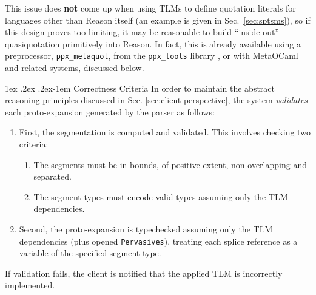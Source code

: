 \documentclass[acmsmall]{acmart}
\makeatletter
\renewcommand{\subsubsection}{%
  \@startsection{subsubsection}{3}%
  {\z@}{1ex \@plus .2ex \@minus .2ex}{-1em}%
  {\normalfont\normalsize\bfseries}%
}
\newcommand{\li}[1]{\lstinline[basicstyle=\ttfamily\fontsize{9pt}{1em}\selectfont]{#1}}
\makeatother
\begin{document}
This issue does \textbf{not} come up when using TLMs to define quotation literals for languages other than Reason itself (an example is given in Sec.~\ref{sec:sptsms}), so if this design proves too limiting, it may be reasonable to build ``inside-out'' quasiquotation primitively into Reason. In fact, this is already available using a preprocessor, \li{ppx_metaquot}, from the \li{ppx_tools} library \cite{ppx-tools}, or with MetaOCaml and related systems, discussed below. %




\subsubsection{Correctness Criteria}
\label{sec:correctness-criteria}
In order to maintain the abstract reasoning principles discussed in Sec. \ref{sec:client-perspective}, the system \emph{validates} each proto-expansion generated by the parser as follows:
\begin{enumerate}
  \item First, the segmentation is computed and validated. This involves checking two criteria:
    \begin{enumerate}
      \item The segments must be in-bounds, of positive extent, non-overlapping and separated.
      \item The segment types must encode valid types assuming only the TLM dependencies.
    \end{enumerate}
  \item Second, the proto-expansion is typechecked assuming only the TLM dependencies (plus opened \li{Pervasives}), treating each splice reference as a variable of the specified segment type.
\end{enumerate}
If validation fails, the client is notified that the applied TLM is incorrectly implemented.%
\end{document}
